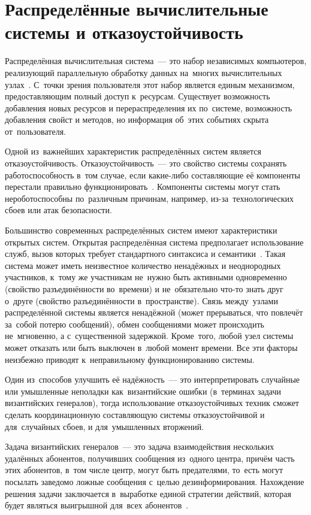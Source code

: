 \pagebreak


\section{Распределённые вычислительные системы и отказоустойчивость}\label{sec:1}
Распределённая вычислительная система~--- это набор независимых компьютеров, реализующий параллельную обработку данных на~многих вычислительных узлах~\autocite{Tanenbaum}. С~точки зрения пользователя этот набор является единым механизмом, предоставляющим полный доступ к~ресурсам. Существует возможность добавления новых ресурсов и перераспределения их по~системе, возможность добавления свойст и методов, но информация об~этих событиях скрыта от~пользователя.

Одной из~важнейших характеристик распределённых систем является отказоустойчивость. Отказоустойчивость~--- это свойство системы сохранять работоспособность в~том случае, если какие-либо составляющие её компоненты перестали правильно функционировать~\autocite{Tanenbaum}. Компоненты системы могут стать нероботоспособны по~различным причинам, например, из-за~технологических сбоев или атак безопасности.

Большинство современных распределённых систем имеют характеристики открытых систем. Открытая распределённая система предполагает использование служб, вызов которых требует стандартного синтаксиса и семантики~\autocite{Kosyakov}. Такая система может иметь неизвестное количество ненадёжных и неоднородных участников, к~тому же участникам не~нужно быть активными одновременно (свойство разъединённости во~времени) и не~обязательно что-то знать друг о~друге (свойство разъединённости в~пространстве). Связь между~узлами распределённой системы является ненадёжной (может прерываться, что повлечёт за~собой потерю сообщений), обмен сообщениями может происходить не~мгновенно, а с~существенной задержкой. Кроме~того, любой узел системы может отказать или быть выключен в~любой момент времени. Все эти факторы неизбежно приводят к~неправильному функционированию системы.

Один из~способов улучшить её надёжность~--- это интерпретировать случайные или умышленные неполадки как~византийские ошибки (в~терминах задачи византийских генералов), тогда использование отказоустойчивых техник сможет сделать координационную составляющую системы отказоустойчивой и для~случайных сбоев, и для~умышленных вторжений.

Задача византийских генералов~--- это задача взаимодействия нескольких удалённых абонентов, получивших сообщения из~одного центра, причём часть этих абонентов, в~том числе центр, могут быть предателями, то~есть могут посылать заведомо ложные сообщения с~целью дезинформирования. Нахождение решения задачи заключается в~выработке единой стратегии действий, которая будет являться выигрышной для~всех абонентов~\autocite{byzgen}.

